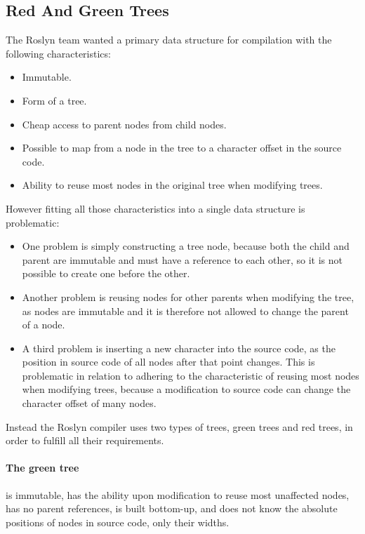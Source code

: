 \subsection{Red And Green Trees}
The Roslyn team wanted a primary data structure for compilation with the following characteristics\cite{lippert2012redgreen}:
\begin{itemize}
	\item Immutable.
	\item Form of a tree.
	\item Cheap access to parent nodes from child nodes.
	\item Possible to map from a node in the tree to a character offset in the source code.
	\item Ability to reuse most nodes in the original tree when modifying trees.
\end{itemize}
However fitting all those characteristics into a single data structure is problematic\cite{lippert2012redgreen}:
\begin{itemize}
\item One problem is simply constructing a tree node, because both the child and parent are immutable and must have a reference to each other, so it is not possible to create one before the other.
\item Another problem is reusing nodes for other parents when modifying the tree, as nodes are immutable and it is therefore not allowed to change the parent of a node. 
\item A third problem is inserting a new character into the source code, as the position in source code of all nodes after that point changes. This is problematic in relation to adhering to the characteristic of reusing most nodes when modifying trees, because a modification to source code can change the character offset of many nodes.
\end{itemize}

Instead the Roslyn compiler uses two types of trees, green trees and red trees, in order to fulfill all their requirements.

\paragraph{The green tree} is immutable, has the ability upon modification to reuse most unaffected nodes, has no parent references, is built bottom-up, and does not know the absolute positions of nodes in source code, only their widths\cite{lippert2012redgreen}.

